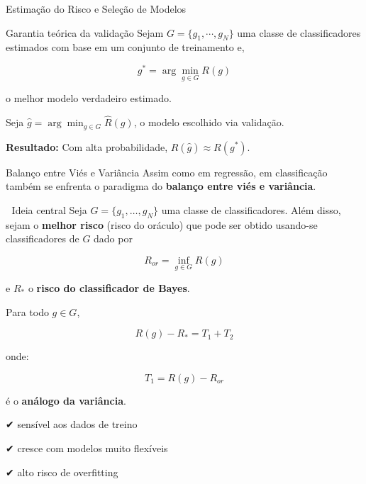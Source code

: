 \documentclass[
  ignorenonframetext,
  aspectratio=169,
]{beamer}
\begin{document}
\begin{frame}{Estimação do Risco e Seleção de Modelos}
\label{estimauxe7uxe3o-do-risco-e-seleuxe7uxe3o-de-modelos-2}
\begin{block}{Garantia teórica da validação}
\label{garantia-teuxf3rica-da-validauxe7uxe3o}
Sejam \(G = \{g_1,\cdots, g_N\}\) uma classe de classificadores
estimados com base em um conjunto de treinamento e,

\[
g^*
=
\arg\min_{g\in G}R(g)
\]

o melhor modelo verdadeiro estimado.

Seja \(\hat g=\arg\min_{g\in G}\hat R(g)\), o modelo escolhido via
validação.

\textbf{Resultado:} Com alta probabilidade, \(R(\hat g)\approx R(g^*)\).
\end{block}
\end{frame}

\begin{frame}{}
\label{section}
\end{frame}

\begin{frame}{}
\label{section-1}
\end{frame}

\begin{frame}{Balanço entre Viés e Variância}
\label{balanuxe7o-entre-viuxe9s-e-variuxe2ncia}
Assim como em regressão, em classificação também se enfrenta o paradigma
do \textbf{balanço entre viés e variância}.

\begin{block}{🎯 Ideia central}
\label{ideia-central}
Seja \(G=\{g_1,\dots,g_N\}\) uma classe de classificadores. Além disso,
sejam o \textbf{melhor risco} (risco do oráculo) que pode ser obtido
usando-se classificadores de \(G\) dado por

\[
R_{or}
=
\inf_{g\in G} R(g)
\]

e \(R_*\) o \textbf{risco do classificador de Bayes}.
\end{block}
\end{frame}

\begin{frame}
Para todo \(g \in G\),

\[
R(g)-R_* = T_1 + T_2
\]

onde:

\[
T_1 = R(g)-R_{or}
\]

é o \textbf{análogo da variância}.

✔ sensível aos dados de treino

✔ cresce com modelos muito flexíveis

✔ alto risco de overfitting
\end{frame}
\end{document}
